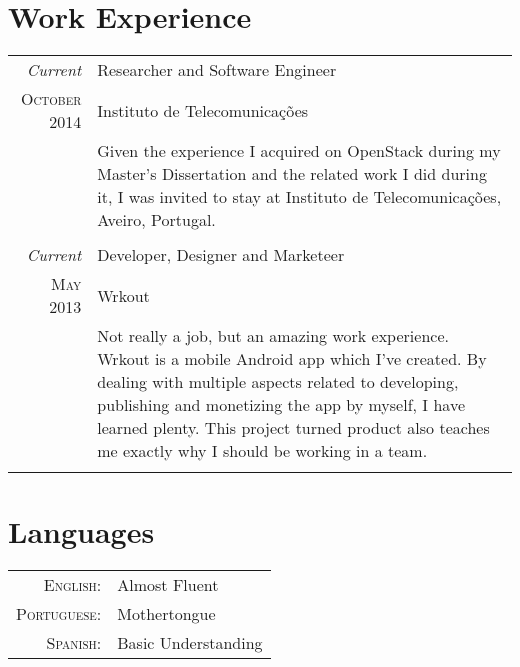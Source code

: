 \documentclass[a4paper,10pt]{article} %
\begin{document}

\section{Work Experience}

\begin{tabular}{r|p{11cm}}
	\emph{Current} & Researcher and Software Engineer \\
	\textsc{October 2014} & Instituto de Telecomunicações \\ 
	& \footnotesize{Given the experience I acquired on OpenStack during my Master's Dissertation and the related work I did during it, I was invited to stay at Instituto de Telecomunicações, Aveiro, Portugal.}\\
	\multicolumn{2}{c}{} \\
	
	\emph{Current} & Developer, Designer and Marketeer \\
	\textsc{May 2013} & Wrkout \\ 
	& \footnotesize{Not really a job, but an amazing work experience. Wrkout is a mobile Android app which I've created. By dealing with multiple aspects related to developing, publishing and monetizing the app by myself, I have learned plenty. This project turned product also teaches me exactly why I should be working in a team.}\\
	\multicolumn{2}{c}{}\\
	
\end{tabular}


\section{Languages}

\begin{tabular}{rl}
	\textsc{English:} & Almost Fluent\\
	
	\textsc{Portuguese:} & Mothertongue\\
	
	\textsc{Spanish:} & Basic Understanding\\
\end{tabular} \\
\end{document}
